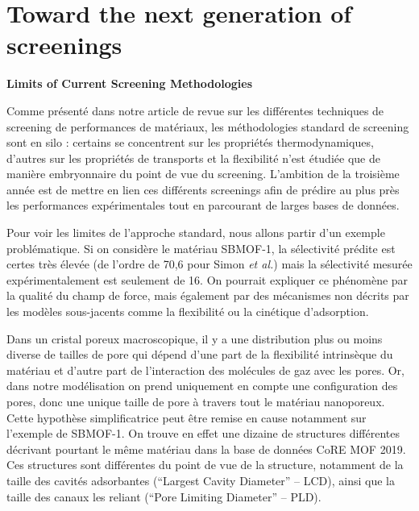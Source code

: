 \documentclass[main]{subfiles}
\begin{document}
\chapter{Toward the next generation of screenings}
\vspace*{-1\baselineskip}

\textbf{Limits of Current Screening Methodologies}

Comme présenté dans notre article de revue sur les différentes techniques de screening de performances de matériaux,\autocite{Ren_2022} les méthodologies standard de screening sont en silo : certains se concentrent sur les propriétés thermodynamiques, d'autres sur les propriétés de transports et la flexibilité n'est étudiée que de manière embryonnaire du point de vue du screening. L'ambition de la troisième année est de mettre en lien ces différents screenings afin de prédire au plus près les performances expérimentales tout en parcourant de larges bases de données. 

Pour voir les limites de l'approche standard, nous allons partir d'un exemple problématique. Si on considère le matériau SBMOF-1,\autocite{Banerjee_2016} la sélectivité prédite est certes très élevée (de l'ordre de 70,6 pour Simon \emph{et al.}) mais la sélectivité mesurée expérimentalement est seulement de 16. On pourrait expliquer ce phénomène par la qualité du champ de force, mais également par des mécanismes non décrits par les modèles sous-jacents comme la flexibilité ou la cinétique d'adsorption.

Dans un cristal poreux macroscopique, il y a une distribution plus ou moins diverse de tailles de pore qui dépend d'une part de la flexibilité intrinsèque du matériau et d'autre part de l'interaction des molécules de gaz avec les pores. Or, dans notre modélisation on prend uniquement en compte une configuration des pores, donc une unique taille de pore à travers tout le matériau nanoporeux. Cette hypothèse simplificatrice peut être remise en cause notamment sur l'exemple de SBMOF-1. On trouve en effet une dizaine de structures différentes décrivant pourtant le même matériau dans la base de données CoRE MOF 2019. Ces structures sont différentes du point de vue de la structure, notamment de la taille des cavités adsorbantes (``Largest Cavity Diameter'' -- LCD), ainsi que la taille des canaux les reliant (``Pore Limiting Diameter'' -- PLD). 
\end{document}
